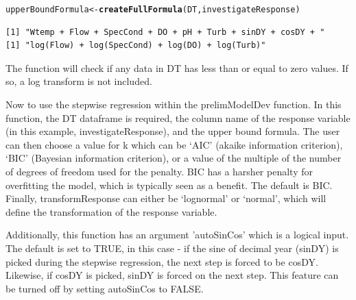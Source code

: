\documentclass[a4paper,11pt]{article}\usepackage[]{graphicx}\usepackage[]{color}
\makeatletter
\newcommand{\hlstd}[1]{\textcolor[rgb]{0.345,0.345,0.345}{#1}}%
\newcommand{\hlkwb}[1]{\textcolor[rgb]{0.69,0.353,0.396}{#1}}%
\newcommand{\hlkwd}[1]{\textcolor[rgb]{0.737,0.353,0.396}{\textbf{#1}}}%
\newenvironment{kframe}{%
 \def\at@end@of@kframe{}%
 \ifinner\ifhmode%
  \def\at@end@of@kframe{\end{minipage}}%
  \begin{minipage}{\columnwidth}%
 \fi\fi%
 \def\FrameCommand##1{\hskip\@totalleftmargin \hskip-\fboxsep
 \colorbox{shadecolor}{##1}\hskip-\fboxsep
     \hskip-\linewidth \hskip-\@totalleftmargin \hskip\columnwidth}%
 \MakeFramed {\advance\hsize-\width
   \@totalleftmargin\z@ \linewidth\hsize
   \@setminipage}}%
 {\par\unskip\endMakeFramed%
 \at@end@of@kframe}
\newenvironment{knitrout}{}{} %
\makeatother
\begin{document}
\begin{knitrout}
\color{fgcolor}\begin{kframe}
\begin{alltt}
\hlstd{upperBoundFormula} \hlkwb{<-} \hlkwd{createFullFormula}\hlstd{(DT,investigateResponse)}
\end{alltt}
\end{kframe}
\end{knitrout}

\begin{knitrout}
\color{fgcolor}\begin{kframe}
\begin{verbatim}
[1] "Wtemp + Flow + SpecCond + DO + pH + Turb + sinDY + cosDY + "
[1] "log(Flow) + log(SpecCond) + log(DO) + log(Turb)"
\end{verbatim}
\end{kframe}
\end{knitrout}

The function will check if any data in DT has less than or equal to zero values. If so, a log transform is not included.

Now to use the stepwise regression within the prelimModelDev function. In this function, the DT dataframe is required, the column name of the response variable (in this example, investigateResponse), and the upper bound formula. The user can then choose a value for k which can be `AIC' (akaike information criterion), `BIC' (Bayesian information criterion), or a value of the multiple of the number of degrees of freedom used for the penalty. BIC has a harsher penalty for overfitting the model, which is typically seen as a benefit. The default is BIC. Finally, transformResponse can either be `lognormal' or `normal', which will define the transformation of the response variable. 

Additionally, this function has an argument 'autoSinCos' which is a logical input. The default is set to TRUE, in this case - if the sine of decimal year (sinDY) is picked during the stepwise regression, the next step is forced to be cosDY. Likewise, if cosDY is picked, sinDY is forced on the next step. This feature can be turned off by setting autoSinCos to FALSE.
\end{document}
